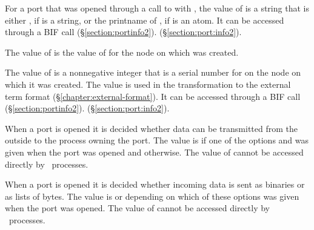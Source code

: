 \begin{Lentry}
\item[\T{command[\Z{R}]}]
For a port that was opened through a call to  with
, the
value of  is a string that is either , if  is a string,
or the printname of , if  is an atom.
It can be accessed through a BIF call
\ifOld {}
(\S\ref{section:portinfo2}).\fi
\ifStd {}
(\S\ref{section:port:info2}).\fi
{}

\item[\T{creation[\Z{R}]}]
The value of  is the value of  for the
node  on which  was created.

\item[\T{ID[\Z{R}]}]
The value of  is a nonnegative integer that is a serial number for 
on the node on which it was
created.  The value is used in the transformation
to the external term format (\S\ref{chapter:external-format}).
It can be accessed through a BIF call
\ifOld {}
(\S\ref{section:portinfo2}).\fi
\ifStd {}
(\S\ref{section:port:info2}).\fi
{}

\item[\T{in[\Z{R}]}]
When a port is opened it is decided whether data can be transmitted from the outside to
the process owning the port.  The value is  if one of the options  and  was
given when the port was opened and  otherwise.  The value of  cannot
be accessed directly by \Erlang\ processes.

\item[\T{in_format[\Z{R}]}]
When a port is opened it is decided whether incoming data is sent as binaries or as lists of
bytes.  The value is  or  depending on which of these options was given when
the port was opened.  The value of  cannot be accessed directly by
\Erlang\ processes.


\end{Lentry}
